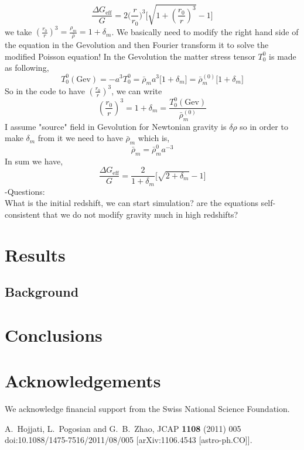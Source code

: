 \documentclass[a4paper,10pt]{article}
\def\be{\begin{equation}}
\def\ee{\end{equation}}
\begin{document}
\be
\frac{\Delta G_{\text{eff}}}{G} = 2 \Big( \frac{r}{r_0} \Big)^3 \Big[ \sqrt{1+ ( \frac{r_0}{r} )^3} -1 \Big]
\ee
we take $(\frac{r_0}{r})^3 = \frac{\rho_m} {\bar{\rho}} = 1+\delta_m  $. 
We basically need to modify the right hand side of the equation in the Gevolution and then Fourier transform it to solve the modified Poisson equation! In the Gevolution the matter stress tensor $T_0^0$ is made as following,
\be
T_0^0 (\text{Gev}) = -a^3 T_0^0 = \bar{\rho}_m a^3 \big[1 + \delta_m \big] =  \bar{\rho}^{(0)}_m \big[1 + \delta_m \big]
\ee
So in the code to have $(\frac{r_0}{r})^3$, we can write
\be
(\frac{r_0}{r})^3 = 1+\delta_m  = \frac{T_0^0 (\text{Gev}) }{\bar{\rho}^{(0)}_m}
\ee
I assume "source" field in Gevolution for Newtonian gravity is $\delta \rho$ so in order to make $\delta_m$ from it we need to have $\bar 
\rho_m$ which is,
\be
\bar{\rho}_m = \bar{\rho}_m^0 a^{-3}
\ee
In sum we have,
\be
\frac{\Delta G_{\text{eff}}}{G} = \frac2 {1+ \delta_m} \Big[ \sqrt{2+ \delta_m} -1 \Big]
\ee
-Questions:\\
What is the initial redshift, we can start simulation? are the equations self-consistent that we do not modify gravity much in high redshifts?

\section{Results}
\subsection{Background}

\section{Conclusions}

\setcounter{equation}{0}

 
\section*{Acknowledgements}

We acknowledge financial support from the Swiss National Science Foundation.


\appendix
%

%



\begin{thebibliography}{999}
\newcommand{\bb}{\bibitem}
  A.~Hojjati, L.~Pogosian and G.~B.~Zhao,
  JCAP {\bf 1108} (2011) 005
  doi:10.1088/1475-7516/2011/08/005
  [arXiv:1106.4543 [astro-ph.CO]].
 \end{thebibliography}
\end{document}
